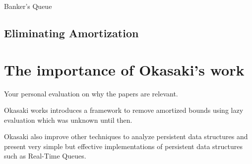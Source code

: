 \documentclass[12pt, a4paper]{article} %
\begin{document}
\begin{listing}[h]
    \inputminted{haskell}{../../Chapter6/BankersQueue.hs}
    \caption{Banker's Queue}
    \label{lst:banker's queue}
\end{listing}


















\subsection{Eliminating Amortization}%
\label{sub:Eliminating Amortization}


















\section{The importance of Okasaki's work}%
\label{sec:importance}

Your personal evaluation on why the papers are relevant.

Okasaki works introduces a framework to remove amortized bounds using lazy evaluation which was unknown until then.

Okasaki also improve other techniques to analyze persistent data structures and present very simple but effective implementations of persistent data structures such as Real-Time Queues.




















\end{document}
